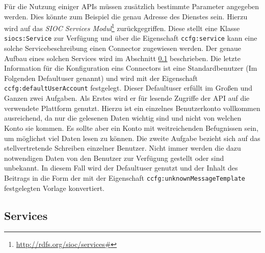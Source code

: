 Für die Nutzung einiger APIs müssen zusätzlich bestimmte Parameter angegeben werden. Dies könnte zum Beispiel die genau Adresse des Dienstes sein. Hierzu wird auf das \emph{SIOC Services Modul}\footnote{\url{http://rdfs.org/sioc/services\#}} zurückgegriffen. Diese stellt eine Klasse \texttt{siocs:Service} zur Verfügung und über die Eigenschaft \texttt{ccfg:service} kann eine solche Servicebeschreibung einen Connector zugewiesen werden. Der genaue Aufbau eines solchen Services wird im Abschnitt \ref{sub:services} beschrieben. Die letzte Information für die Konfiguration eins Connectors ist eine Standardbenutzer (Im Folgenden Defaultuser genannt) und wird mit der Eigenschaft \texttt{ccfg:defaultUserAccount} festgelegt. Dieser Defaultuser erfüllt im Großen und Ganzen zwei Aufgaben. Als Erstes wird er für lesende Zugriffe der API auf die verwendete Plattform genutzt. Hierzu ist ein einzelnes Benutzerkonto vollkommen ausreichend, da nur die gelesenen Daten wichtig sind und nicht von welchen Konto sie kommen. Es sollte aber ein Konto mit weitreichenden Befugnissen sein, um möglichst viel Daten lesen zu können. Die zweite Aufgabe bezieht sich auf das stellvertretende Schreiben einzelner Benutzer. Nicht immer werden die dazu notwendigen Daten von den Benutzer zur Verfügung gestellt oder sind unbekannt. In diesem Fall wird der Defaultuser genutzt und der Inhalt des Beitrags in die Form der mit der Eigenschaft \texttt{\texttt{ccfg:unknownMessageTemplate}} festgelegten Vorlage konvertiert. 


\subsection{Services} %
\label{sub:services}

